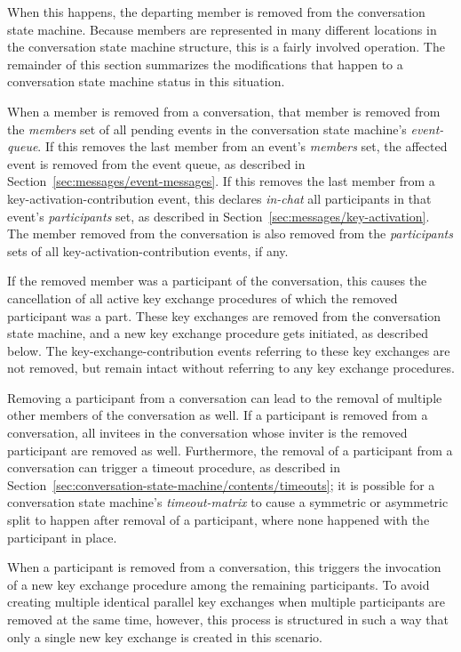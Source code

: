 \documentclass{article}
\def\smfield#1{\textsl{#1}}
\def\type#1{\textsf{#1}}
\begin{document}
When this happens, the departing member is removed from the conversation state machine.
Because members are represented in many different locations in the conversation state machine structure, this is a fairly involved operation.
The remainder of this section summarizes the modifications that happen to a conversation state machine status in this situation.

When a member is removed from a conversation, that member is removed from the \smfield{members} set of all pending events in the conversation state machine's \smfield{event-queue}.
If this removes the last member from an event's \smfield{members} set, the affected event is removed from the event queue, as described in Section~\ref{sec:messages/event-messages}.
If this removes the last member from a \type{key-activation-contribution} event, this declares \smfield{in-chat} all participants in that event's \smfield{participants} set, as described in Section~\ref{sec:messages/key-activation}.
The member removed from the conversation is also removed from the \smfield{participants} sets of all \type{key-activation-contribution} events, if any.

If the removed member was a participant of the conversation, this causes the cancellation of all active key exchange procedures of which the removed participant was a part.
These key exchanges are removed from the conversation state machine, and a new key exchange procedure gets initiated, as described below.
The \type{key-exchange-contribution} events referring to these key exchanges are not removed, but remain intact without referring to any key exchange procedures.

Removing a participant from a conversation can lead to the removal of multiple other members of the conversation as well.
If a participant is removed from a conversation, all invitees in the conversation whose inviter is the removed participant are removed as well.
Furthermore, the removal of a participant from a conversation can trigger a timeout procedure, as described in Section~\ref{sec:conversation-state-machine/contents/timeouts}; it is possible for a conversation state machine's \smfield{timeout-matrix} to cause a symmetric or asymmetric split to happen after removal of a participant, where none happened with the participant in place.

When a participant is removed from a conversation, this triggers the invocation of a new key exchange procedure among the remaining participants.
To avoid creating multiple identical parallel key exchanges when multiple participants are removed at the same time, however, this process is structured in such a way that only a single new key exchange is created in this scenario.
\end{document}
